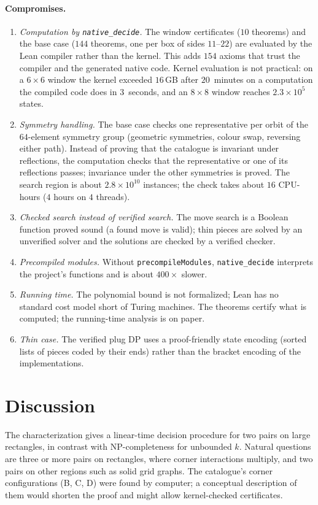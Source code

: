 \documentclass[11pt]{article}
\newcommand{\nd}{\texttt{native\_decide}\xspace}
\begin{document}
\paragraph{Compromises.}
\begin{enumerate}
\item \emph{Computation by \nd.} The window certificates ($10$ theorems) and the base case
  ($144$ theorems, one per box of sides $11$--$22$) are evaluated by the Lean compiler rather than
  the kernel. This adds $154$ axioms that trust the compiler and the generated native code. Kernel
  evaluation is not practical: on a $6\times6$ window the kernel exceeded $16$\,GB after
  $20$~minutes on a computation the compiled code does in $3$~seconds, and an $8\times8$ window
  reaches $2.3\times10^5$ states.
\item \emph{Symmetry handling.} The base case checks one representative per orbit of the
  $64$-element symmetry group (geometric symmetries, colour swap, reversing either path). Instead
  of proving that the catalogue is invariant under reflections, the computation checks that the
  representative or one of its reflections passes; invariance under the other symmetries is proved.
  The search region is about $2.8\times10^{10}$ instances; the check takes about $16$ CPU-hours
  ($4$ hours on $4$ threads).
\item \emph{Checked search instead of verified search.} The move search is a Boolean function
  proved sound (a found move is valid); thin pieces are solved by an unverified solver and the
  solutions are checked by a verified checker.
\item \emph{Precompiled modules.} Without \texttt{precompileModules}, \nd interprets the
  project's functions and is about $400\times$ slower.
\item \emph{Running time.} The polynomial bound is not formalized; Lean has no standard cost model
  short of Turing machines. The theorems certify what is computed; the running-time analysis is
  on paper.
\item \emph{Thin case.} The verified plug DP uses a proof-friendly state encoding (sorted lists of
  pieces coded by their ends) rather than the bracket encoding of the implementations.
\end{enumerate}

\section{Discussion}

The characterization gives a linear-time decision procedure for two pairs on large rectangles, in
contrast with NP-completeness for unbounded $k$. Natural questions are three or more pairs on
rectangles, where corner interactions multiply, and two pairs on other regions such as solid grid
graphs. The catalogue's corner configurations (B, C, D) were found by computer; a conceptual
description of them would shorten the proof and might allow kernel-checked certificates.
\end{document}
